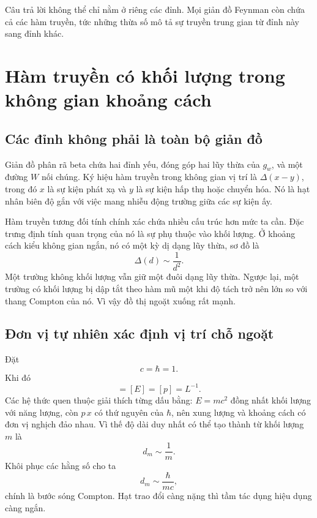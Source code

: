 Câu trả lời không thể chỉ nằm ở riêng các đỉnh. Mọi giản đồ Feynman còn chứa cả các hàm truyền, tức những thừa số mô tả sự truyền trung gian từ đỉnh này sang đỉnh khác.

\section{Hàm truyền có khối lượng trong không gian khoảng cách}

\subsection{Các đỉnh không phải là toàn bộ giản đồ}

Giản đồ phân rã beta chứa hai đỉnh yếu, đóng góp hai lũy thừa của \(g_w\), và một đường \(W\) nối chúng. Ký hiệu hàm truyền trong không gian vị trí là \(\Delta(x-y)\), trong đó \(x\) là sự kiện phát xạ và \(y\) là sự kiện hấp thụ hoặc chuyển hóa. Nó là hạt nhân biên độ gắn với việc mang nhiễu động trường giữa các sự kiện ấy.

Hàm truyền tương đối tính chính xác chứa nhiều cấu trúc hơn mức ta cần. Đặc trưng định tính quan trọng của nó là sự phụ thuộc vào khối lượng. Ở khoảng cách kiểu không gian ngắn, nó có một kỳ dị dạng lũy thừa, sơ đồ là
\begin{equation}
  \Delta(d)\sim\frac1{d^2}.
\end{equation}
Một trường không khối lượng vẫn giữ một đuôi dạng lũy thừa. Ngược lại, một trường có khối lượng bị dập tắt theo hàm mũ một khi độ tách trở nên lớn so với thang Compton của nó. Vì vậy đồ thị ngoặt xuống rất mạnh.

\subsection{Đơn vị tự nhiên xác định vị trí chỗ ngoặt}

Đặt
\begin{equation}
  c=\hbar=1.
\end{equation}
Khi đó
\begin{equation}
  [m]=[E]=[p]=L^{-1}.
\end{equation}
Các hệ thức quen thuộc giải thích từng dấu bằng: \(E=mc^2\) đồng nhất khối lượng với năng lượng, còn \(p\,x\) có thứ nguyên của \(\hbar\), nên xung lượng và khoảng cách có đơn vị nghịch đảo nhau. Vì thế độ dài duy nhất có thể tạo thành từ khối lượng \(m\) là
\begin{equation}
  d_m\sim\frac1m.
\end{equation}
Khôi phục các hằng số cho ta
\begin{equation}
  d_m\sim\frac{\hbar}{mc},
\end{equation}
chính là bước sóng Compton. Hạt trao đổi càng nặng thì tầm tác dụng hiệu dụng càng ngắn.

